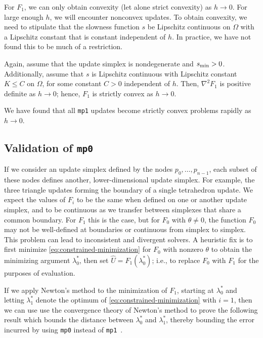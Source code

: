 \documentclass[sisc-eikonal.tex]{subfiles}
\begin{document}
For $F_1$, we can only obtain convexity (let alone strict convexity)
as $h \to 0$. For large enough $h$, we will encounter nonconvex
updates. To obtain convexity, we need to stipulate that the slowness
function $s$ be Lipschitz continuous on $\Omega$ with a Lipschitz
constant that is constant independent of $h$. In practice, we have not
found this to be much of a restriction.

\begin{lemma}\label{lemma:F-strictly-convex}
  Again, assume that the update simplex is nondegenerate and
  $s_{\operatorname{min}} > 0$. Additionally, assume that $s$ is Lipschitz continuous
  with Lipschitz constant $K \leq C$ on $\Omega$, for some constant
  $C > 0$ independent of $h$. Then, $\nabla^2 F_1$ is positive
  definite as $h \to 0$; hence, $F_1$ is strictly convex as $h \to 0$.
\end{lemma}

We have found that all \texttt{mp1} updates become strictly convex
problems rapidly as $h \to 0$.

\subsection{Validation of \texttt{mp0}}\label{ssec:validation}

If we consider an update simplex defined by the nodes
$p_0, \hdots, p_{n-1}$, each subset of these nodes defines another,
lower-dimensional update simplex. For example, the three triangle
updates forming the boundary of a single tetrahedron update. We expect
the values of $F_i$ to be the same when defined on one or another
update simplex, and to be continuous as we transfer between simplexes
that share a common boundary. For $F_1$ this is the case, but for
$F_0$ with $\theta \neq 0$, the function $F_0$ may not be well-defined
at boundaries or continuous from simplex to simplex. This problem can
lead to inconsistent and divergent solvers. A heuristic fix is to
first minimize \cref{eq:constrained-minimization} for $F_0$ with
nonzero $\theta$ to obtain the minimizing argument $\lambda^*_0$, then
set $\hat{U} = F_1(\lambda_0^*)$; i.e., to replace $F_0$ with $F_1$
for the purposes of evaluation.

If we apply Newton's method to the minimization of $F_1$, starting at
$\lambda_0^*$ and letting $\lambda_1^*$ denote the optimum of
\cref{eq:constrained-minimization} with $i = 1$, then we can use use
the convergence theory of Newton's method to prove the following
result which bounds the distance between $\lambda_0^*$ and
$\lambda_1^*$, thereby bounding the error incurred by using
\texttt{mp0} instead of \texttt{mp1}~\cite{stoer2013introduction}.
\end{document}
